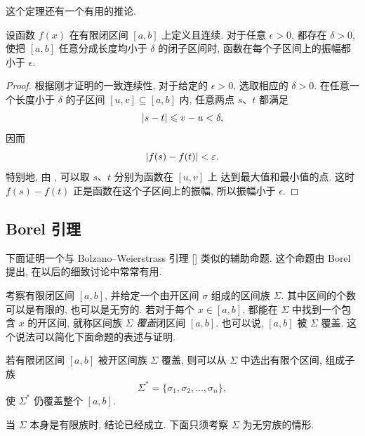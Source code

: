 这个定理还有一个有用的推论.
\begin{corollary}\label{cor:uniform_small_interval_oscillation}
设函数 $f(x)$ 在有限闭区间 $[a,b]$ 上定义且连续.
对于任意 $\epsilon>0$, 都存在 $\delta>0$,
使把 $[a,b]$ 任意分成长度均小于 $\delta$ 的闭子区间时,
函数在每个子区间上的振幅都小于 $\epsilon$.
\end{corollary}

\begin{proof}
根据刚才证明的一致连续性, 对于给定的 $\epsilon>0$,
选取相应的 $\delta>0$.
在任意一个长度小于 $\delta$ 的子区间 $[u,v]\subseteq[a,b]$ 内,
任意两点 $s$、$t$ 都满足
$$
\left| s-t \right|\leqslant v-u<\delta,
$$
因而
$$
\left| f(s)-f(t) \right|<\varepsilon.
$$
特别地, 由 , 可以取 $s$、$t$ 分别为函数在 $[u,v]$ 上
达到最大值和最小值的点.
这时 $f(s)-f(t)$ 正是函数在这个子区间上的振幅,
所以振幅小于 $\epsilon$.
\end{proof}

\subsection{Borel 引理}\label{subsec:88}
下面证明一个与 Bolzano--Weierstrass 引理 [] 类似的辅助命题.
这个命题由 Borel 提出, 在以后的细致讨论中常常有用.

考察有限闭区间 $[a,b]$, 并给定一个由开区间 $\sigma$ 组成的区间族 $\Sigma$.
其中区间的个数可以是有限的, 也可以是无穷的.
若对于每个 $x\in[a,b]$, 都能在 $\Sigma$ 中找到一个包含 $x$ 的开区间,
就称区间族 $\Sigma$ \emph{覆盖}闭区间 $[a,b]$.
也可以说, $[a,b]$ 被 $\Sigma$ 覆盖.
这个说法可以简化下面命题的表述与证明.

\begin{namedtheorem}[Borel 引理]\label{lem:borel_finite_cover}若有限闭区间 $[a,b]$ 被开区间族 $\Sigma$ 覆盖,
则可以从 $\Sigma$ 中选出有限个区间, 组成子族
$$
\Sigma^*=\{\sigma_1,\sigma_2,\ldots,\sigma_n\},
$$
使 $\Sigma^*$ 仍覆盖整个 $[a,b]$.
\end{namedtheorem}

当 $\Sigma$ 本身是有限族时, 结论已经成立.
下面只须考察 $\Sigma$ 为无穷族的情形.

